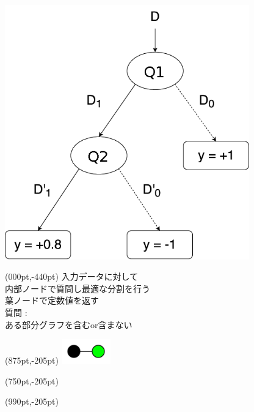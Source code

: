 \vspace{-30pt} \\
\hspace*{720pt}\includegraphics[width=300pt]{img/dtr_drawio.png}
\begin{textblock*}{\textwidth}(000pt,-440pt)
	\vspace*{160pt}
	入力データに対して \\
	内部ノードで質問し最適な分割を行う \\
	葉ノードで定数値を返す \\

	\vspace*{30pt}
	質問 : \\
	ある部分グラフを含むor含まない \\

	\vspace*{20pt}
\end{textblock*}
\begin{textblock*}{\textwidth}(875pt,-205pt)
	\includegraphics[width=60pt]{img/subgraph/kg.png}
\end{textblock*}
\begin{textblock*}{\textwidth}(750pt,-205pt)
	\scriptsize
	\fontsize{18pt}{0pt} 
\end{textblock*}
\begin{textblock*}{\textwidth}(990pt,-205pt)
	\scriptsize
	\fontsize{18pt}{0pt} 
	\end{textblock*}
